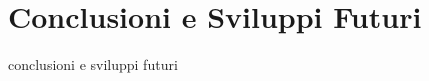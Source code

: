 \documentclass[target=bach,aauheader=,style=]{thud}
\begin{document}
\chapter{Conclusioni e Sviluppi Futuri}

conclusioni e sviluppi futuri


\appendix



\backmatter




\end{document}
